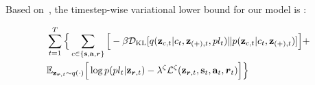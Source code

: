 \documentclass[letterpaper]{article} %
\newcommand{\context}{c}
\newcommand{\expect}{\mathbb{E}}
\newcommand{\latentvariables}{\mathbf{z}}
\newcommand{\state}{\mathbf{s}}
\newcommand{\action}{\mathbf{a}}
\newcommand{\reward}{\boldsymbol{r}}
\newcommand{\player}{pl}
\begin{document}
Based on~\cite{ChungKDGCB15}, the timestep-wise variational lower bound for our model is :

\vspace{-0.2in}
\begin{align} \label{eq:elbo}
    &\sum_{t=1}^{T}\Big\{\sum_{\substack{\context\in\{\state,\action,\reward\}}}\Big[-\beta\mathcal{D}_{\text{KL}}[q(\latentvariables_{\context,t}|\context_{t},\latentvariables_{(+),t},\player_{t})\| p(\latentvariables_{\context,t}|\context_{t},\latentvariables_{(+),t})]\Big]+\nonumber\\
    &\expect_{\latentvariables_{\reward,t} \sim q(\cdot)} \Big[
    \log p(\player_{t}|\latentvariables_{\reward,t})-\raisetag{1\baselineskip}
    \lambda^{\zeta} \mathcal{L}^{\zeta}( \latentvariables_{\reward,t},\state_{t},\action_{t},\reward_{t})\Big]\Big\}
\end{align}
\end{document}
